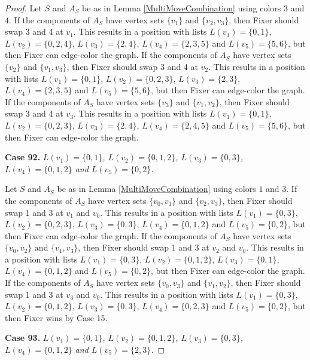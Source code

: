 \documentclass[12pt]{amsart}
\theoremstyle{plain}
\theoremstyle{definition}
\theoremstyle{remark}
\begin{document}
\begin{proof}
Let $S$ and $A_S$ be as in Lemma \ref{MultiMoveCombination} using colors $3$ and $4$. If the components of $A_S$ have vertex sets $\{v_1\}$ and $\{v_2, v_3\}$, then Fixer should swap 3 and 4 at $v_1$. This results in a position with lists $L(v_1) = \{0, 1\}$, $L(v_2) = \{0, 2, 4\}$, $L(v_3) = \{2, 4\}$, $L(v_4) = \{2, 3, 5\}$ and $L(v_5) = \{5, 6\}$, but then Fixer can edge-color the graph.
If the components of $A_S$ have vertex sets $\{v_2\}$ and $\{v_1, v_3\}$, then Fixer should swap 3 and 4 at $v_2$. This results in a position with lists $L(v_1) = \{0, 1\}$, $L(v_2) = \{0, 2, 3\}$, $L(v_3) = \{2, 3\}$, $L(v_4) = \{2, 3, 5\}$ and $L(v_5) = \{5, 6\}$, but then Fixer can edge-color the graph.
If the components of $A_S$ have vertex sets $\{v_3\}$ and $\{v_1, v_2\}$, then Fixer should swap 3 and 4 at $v_3$. This results in a position with lists $L(v_1) = \{0, 1\}$, $L(v_2) = \{0, 2, 3\}$, $L(v_3) = \{2, 4\}$, $L(v_4) = \{2, 4, 5\}$ and $L(v_5) = \{5, 6\}$, but then Fixer can edge-color the graph.

\noindent\textbf{Case 92.  }\textit{$L(v_1) = \{0, 1\}$, $L(v_2) = \{0, 1, 2\}$, $L(v_3) = \{0, 3\}$, $L(v_4) = \{0, 1, 2\}$ and $L(v_5) = \{0, 2\}$.}

Let $S$ and $A_S$ be as in Lemma \ref{MultiMoveCombination} using colors $1$ and $3$. If the components of $A_S$ have vertex sets $\{v_0, v_1\}$ and $\{v_2, v_3\}$, then Fixer should swap 1 and 3 at $v_1$ and $v_0$. This results in a position with lists $L(v_1) = \{0, 3\}$, $L(v_2) = \{0, 2, 3\}$, $L(v_3) = \{0, 3\}$, $L(v_4) = \{0, 1, 2\}$ and $L(v_5) = \{0, 2\}$, but then Fixer can edge-color the graph.
If the components of $A_S$ have vertex sets $\{v_0, v_2\}$ and $\{v_1, v_3\}$, then Fixer should swap 1 and 3 at $v_2$ and $v_0$. This results in a position with lists $L(v_1) = \{0, 3\}$, $L(v_2) = \{0, 1, 2\}$, $L(v_3) = \{0, 1\}$, $L(v_4) = \{0, 1, 2\}$ and $L(v_5) = \{0, 2\}$, but then Fixer can edge-color the graph.
If the components of $A_S$ have vertex sets $\{v_0, v_3\}$ and $\{v_1, v_2\}$, then Fixer should swap 1 and 3 at $v_3$ and $v_0$. This results in a position with lists $L(v_1) = \{0, 3\}$, $L(v_2) = \{0, 1, 2\}$, $L(v_3) = \{0, 3\}$, $L(v_4) = \{0, 2, 3\}$ and $L(v_5) = \{0, 2\}$, but then Fixer wins by Case 15.

\noindent\textbf{Case 93.  }\textit{$L(v_1) = \{0, 1\}$, $L(v_2) = \{0, 1, 2\}$, $L(v_3) = \{0, 3\}$, $L(v_4) = \{0, 1, 2\}$ and $L(v_5) = \{2, 3\}$.}


\end{proof}
\end{document}
